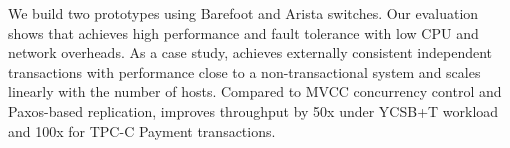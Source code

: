 
We build two \sys prototypes using Barefoot and Arista switches.
Our evaluation shows that \sys achieves high performance and fault tolerance with low CPU and network overheads.
As a case study, \sys achieves externally consistent independent transactions with performance close to a non-transactional system and scales linearly with the number of hosts.
Compared to MVCC concurrency control and Paxos-based replication, \sys improves throughput by 50x under YCSB+T workload and 100x for TPC-C Payment transactions.

